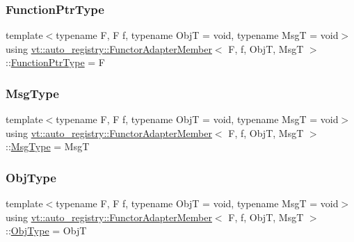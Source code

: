 \subsubsection{\texorpdfstring{Function\+Ptr\+Type}{FunctionPtrType}}
{\footnotesize\ttfamily template$<$typename F, F f, typename ObjT = void, typename MsgT = void$>$ \\
using \hyperlink{structvt_1_1auto__registry_1_1_functor_adapter_member}{vt\+::auto\+\_\+registry\+::\+Functor\+Adapter\+Member}$<$ F, f, ObjT, MsgT $>$\+::\hyperlink{structvt_1_1auto__registry_1_1_functor_adapter_member_a024b0fba6787d70e73f21f171bd69f51}{Function\+Ptr\+Type} =  F}

\mbox{\label{structvt_1_1auto__registry_1_1_functor_adapter_member_aac047547f57874f5b42e9cc3c8ea534f}} 
\subsubsection{\texorpdfstring{Msg\+Type}{MsgType}}
{\footnotesize\ttfamily template$<$typename F, F f, typename ObjT = void, typename MsgT = void$>$ \\
using \hyperlink{structvt_1_1auto__registry_1_1_functor_adapter_member}{vt\+::auto\+\_\+registry\+::\+Functor\+Adapter\+Member}$<$ F, f, ObjT, MsgT $>$\+::\hyperlink{structvt_1_1auto__registry_1_1_functor_adapter_member_aac047547f57874f5b42e9cc3c8ea534f}{Msg\+Type} =  MsgT}

\mbox{\label{structvt_1_1auto__registry_1_1_functor_adapter_member_a0a83596d25d5f460595b4b60b6943c73}} 
\subsubsection{\texorpdfstring{Obj\+Type}{ObjType}}
{\footnotesize\ttfamily template$<$typename F, F f, typename ObjT = void, typename MsgT = void$>$ \\
using \hyperlink{structvt_1_1auto__registry_1_1_functor_adapter_member}{vt\+::auto\+\_\+registry\+::\+Functor\+Adapter\+Member}$<$ F, f, ObjT, MsgT $>$\+::\hyperlink{structvt_1_1auto__registry_1_1_functor_adapter_member_a0a83596d25d5f460595b4b60b6943c73}{Obj\+Type} =  ObjT}



